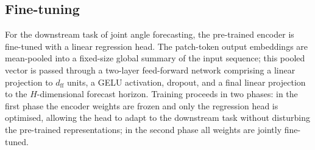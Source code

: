 \subsection{Fine-tuning}\label{sec:method-finetune}

For the downstream task of joint angle forecasting, the pre-trained encoder is
fine-tuned with a linear regression head.  The patch-token output embeddings are
mean-pooled into a fixed-size global summary of the input sequence; this pooled vector
is passed through a two-layer feed-forward network comprising a linear projection to
$d_{\text{ff}}$ units, a GELU activation, dropout, and a final linear projection to the
$H$-dimensional forecast horizon. Training proceeds in two phases: in the first phase
the encoder weights are frozen and only the regression head is optimised, allowing the
head to adapt to the downstream task without disturbing the pre-trained representations;
in the second phase all weights are jointly fine-tuned.
